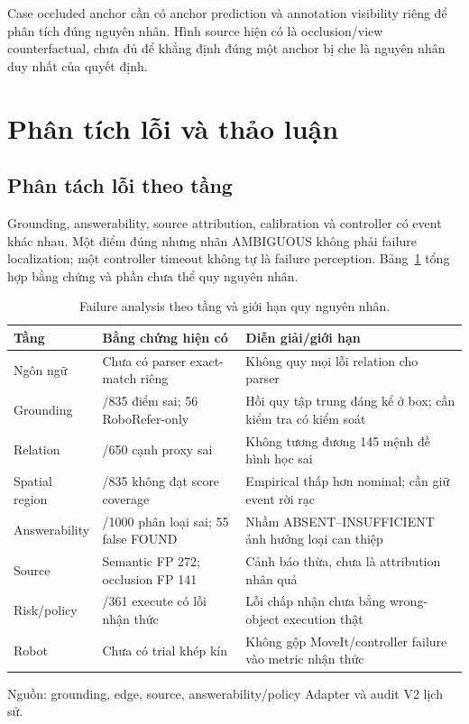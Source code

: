 Case occluded anchor cần có anchor prediction
và annotation visibility riêng để phân tích
đúng nguyên nhân. Hình source hiện có là
occlusion/view counterfactual, chưa đủ để
khẳng định đúng một anchor bị che là nguyên
nhân duy nhất của quyết định.

\section{Phân tích lỗi và thảo luận}
\label{sec:results-failure-analysis}

\subsection{Phân tách lỗi theo tầng}

Grounding, answerability, source attribution,
calibration và controller có event khác nhau.
Một điểm đúng nhưng nhãn AMBIGUOUS không
phải failure localization; một controller
timeout không tự là failure perception.
Bảng~\ref{tab:results-failure-layers} tổng
hợp bằng chứng và phần chưa thể quy nguyên nhân.

\begin{table}[htbp]
    \centering
    \setlength{\tabcolsep}{4pt}
    \renewcommand{\arraystretch}{1.15}
    \caption{Failure analysis theo tầng và giới hạn quy nguyên nhân.}
    \label{tab:results-failure-layers}
    \small
    \begin{tabularx}{\textwidth}{@{}>{\raggedright\arraybackslash}p{}>{\raggedright\arraybackslash}p{}>{\raggedright\arraybackslash}X@{}}
        \toprule
        Tầng & Bằng chứng hiện có & Diễn giải/giới hạn \\
        \midrule
        Ngôn ngữ & Chưa có parser exact-match riêng &
        Không quy mọi lỗi relation cho parser \\
        Grounding & 60/835 điểm sai; 56 RoboRefer-only &
        Hồi quy tập trung đáng kể ở box; cần kiểm tra có kiểm soát \\
        Relation & 145/650 cạnh proxy sai &
        Không tương đương 145 mệnh đề hình học sai \\
        Spatial region & 110/835 không đạt score coverage &
        Empirical thấp hơn nominal; cần giữ event rời rạc \\
        Answerability & 189/1000 phân loại sai; 55 false FOUND &
        Nhầm ABSENT--INSUFFICIENT ảnh hưởng loại can thiệp \\
        Source & Semantic FP 272; occlusion FP 141 &
        Cảnh báo thừa, chưa là attribution nhân quả \\
        Risk/policy & 34/361 execute có lỗi nhận thức &
        Lỗi chấp nhận chưa bằng wrong-object execution thật \\
        Robot & Chưa có trial khép kín &
        Không gộp MoveIt/controller failure vào metric nhận thức \\
        \bottomrule
    \end{tabularx}
    \vspace{2pt}
    {\footnotesize\raggedright Nguồn: grounding, edge, source,
    answerability/policy Adapter và audit V2 lịch sử.\par}
\end{table}

